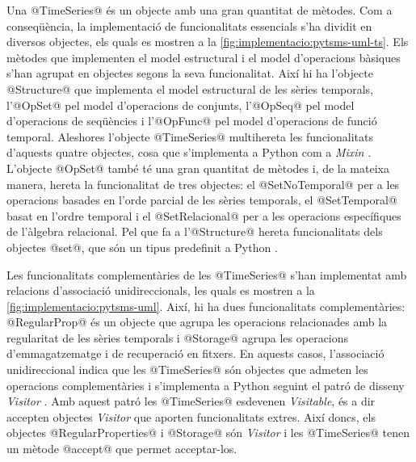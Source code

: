Una @TimeSeries@ és un objecte amb una gran quantitat de
mètodes. Com a conseqüència, la implementació de funcionalitats
essencials s'ha dividit en diversos objectes, els quals es mostren a
la \autoref{fig:implementacio:pytsms-uml-ts}. Els mètodes que
implementen el model estructural i el model d'operacions bàsiques
s'han agrupat en objectes segons la seva funcionalitat. Així hi ha
l'objecte @Structure@ que implementa el model estructural de les
sèries temporals, l'@OpSet@ pel model d'operacions de conjunts,
l'@OpSeq@ pel model d'operacions de seqüències i l'@OpFunc@
pel model d'operacions de funció temporal.  Aleshores l'objecte
@TimeSeries@ multihereta les funcionalitats d'aquests quatre
objectes, cosa que s'implementa a Python com a
\emph{Mixin} \parencite[\S 8.3.6, \S 20.17]{python:doc2}.  L'objecte
@OpSet@ també té una gran quantitat de mètodes i, de la mateixa
manera, hereta la funcionalitat de tres objectes: el
@SetNoTemporal@ per a les operacions basades en l'orde parcial de
les sèries temporals, el @SetTemporal@ basat en l'ordre temporal
i el @SetRelacional@ per a les operacions específiques de
l'àlgebra relacional. Pel que fa a l'@Structure@ hereta
funcionalitats dels objectes @set@, que són un tipus predefinit a
Python \parencite[\S 5.7]{python:doc2}.


Les funcionalitats complementàries de les @TimeSeries@ s'han
implementat amb relacions d'associació unidireccionals, les quals es
mostren a la \autoref{fig:implementacio:pytsms-uml}. Així, hi ha dues
funcionalitats complementàries: @RegularProp@ és un objecte que agrupa
les operacions relacionades amb la regularitat de les sèries temporals
i @Storage@ agrupa les operacions d'emmagatzematge i de recuperació en
fitxers. En aquests casos, l'associació unidireccional indica que les
@TimeSeries@ són objectes que admeten les operacions complementàries i
s'implementa a Python seguint el patró de disseny
\emph{Visitor} \parencite{ziade08:expert_python_programming:visitor,martin02:visitor}. Amb
aquest patró les @TimeSeries@ esdevenen \emph{Visitable}, és a dir
accepten objectes \emph{Visitor} que aporten funcionalitats
extres. Així doncs, els objectes @RegularProperties@ i @Storage@ són
\emph{Visitor} i les @TimeSeries@ tenen un mètode @accept@ que permet
acceptar-los.


